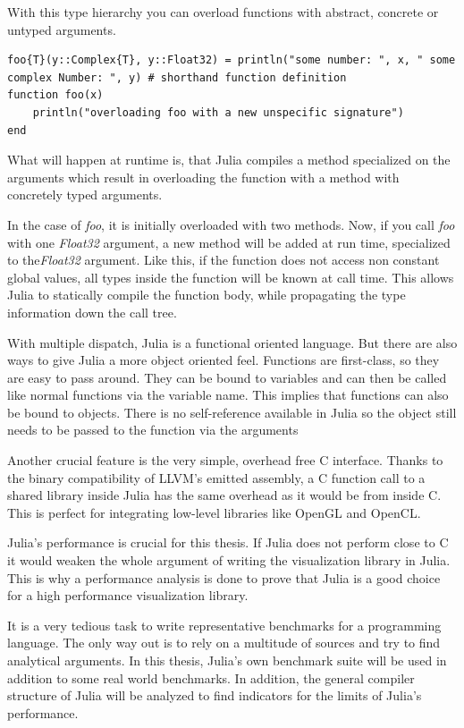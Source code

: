 With this type hierarchy you can overload functions with abstract, concrete or untyped arguments.

\begin{lstlisting}
foo{T}(y::Complex{T}, y::Float32) = println("some number: ", x, " some complex Number: ", y) # shorthand function definition
function foo(x)
    println("overloading foo with a new unspecific signature")
end
\end{lstlisting}

What will happen at runtime is, that Julia compiles a method specialized on the arguments which result in overloading the function with a method with concretely typed arguments.

In the case of \textit{foo}, it is initially overloaded with two methods.
Now, if you call \textit{foo} with one \textit{Float32} argument, a new method will be added at run time, specialized to the\textit{Float32} argument.
Like this, if the function does not access non constant global values, all types inside the function will be known at call time.
This allows Julia to statically compile the function body, while propagating the type information down the call tree.

With multiple dispatch, Julia is a functional oriented language. But there are also ways to give Julia a more object oriented feel.
Functions are first-class, so they are easy to pass around. 
They can be bound to variables and can then be called like normal functions via the variable name. This implies that functions can also be bound to objects.
There is no self-reference available in Julia so the object still needs to be passed to the function via the arguments

Another crucial feature is the very simple, overhead free C interface. 
Thanks to the binary compatibility of \ac{LLVM}'s emitted assembly, a C function call to a shared library inside Julia has the same overhead as it would be from inside C\cite{CCALL}. 
This is perfect for integrating low-level libraries like \ac{OpenGL} and \ac{OpenCL}.

Julia's performance is crucial for this thesis. 
If Julia does not perform close to C it would weaken the whole argument of writing the visualization library in Julia.
This is why a performance analysis is done to prove that Julia is a good choice for a high performance visualization library.

It is a very tedious task to write representative benchmarks for a programming language. 
The only way out is to rely on a multitude of sources and try to find analytical arguments.
In this thesis, Julia's own benchmark suite will be used in addition to some real world benchmarks.
In addition, the general compiler structure of Julia will be analyzed to find indicators for the limits of Julia's performance.

